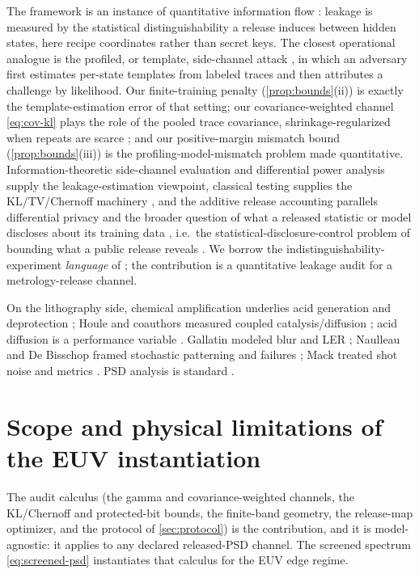 \documentclass[11pt]{article}
\begin{document}
The framework is an instance of quantitative information flow \cite{smith2009,alvim2020}: leakage is measured by the statistical distinguishability a release induces between hidden states, here recipe coordinates rather than secret keys. The closest operational analogue is the profiled, or template, side-channel attack \cite{chari2003,choudary2013}, in which an adversary first estimates per-state templates from labeled traces and then attributes a challenge by likelihood. Our finite-training penalty (\cref{prop:bounds}(ii)) is exactly the template-estimation error of that setting; our covariance-weighted channel \eqref{eq:cov-kl} plays the role of the pooled trace covariance, shrinkage-regularized when repeats are scarce \cite{ledoit2004}; and our positive-margin mismatch bound (\cref{prop:bounds}(iii)) is the profiling-model-mismatch problem made quantitative. Information-theoretic side-channel evaluation \cite{standaert2009} and differential power analysis \cite{kocher1999} supply the leakage-estimation viewpoint, classical testing supplies the KL/TV/Chernoff machinery \cite{cover2006}, and the additive release accounting parallels differential privacy \cite{dwork2006} and the broader question of what a released statistic or model discloses about its training data \cite{shokri2017}, i.e.\ the statistical-disclosure-control problem of bounding what a public release reveals \cite{dinur2003}. We borrow the indistinguishability-experiment \emph{language} of \cite{goldwasser1984}; the contribution is a quantitative leakage audit for a metrology-release channel.

On the lithography side, chemical amplification underlies acid generation and deprotection \cite{ito1983,reichmanis1991,wallraff1999}; Houle and coauthors measured coupled catalysis/diffusion \cite{houle2000,houle2004}; acid diffusion is a performance variable \cite{vansteenwinckel2005}. Gallatin modeled blur and LER \cite{gallatin2005,gallatin2008}; Naulleau and De Bisschop framed stochastic patterning and failures \cite{naulleau2011,deBisschop2017}; Mack treated shot noise and metrics \cite{mack2018shot,mack2019metrics}. PSD analysis is standard \cite{constantoudis2004,lorusso2018,cutler2021,palasantzas1993,wallow2008}.

\section{Scope and physical limitations of the EUV instantiation}
\label{sec:limitations}

The audit calculus (the gamma and covariance-weighted channels, the KL/Chernoff and protected-bit bounds, the finite-band geometry, the release-map optimizer, and the protocol of \cref{sec:protocol}) is the contribution, and it is model-agnostic: it applies to any declared released-PSD channel. The screened spectrum \eqref{eq:screened-psd} instantiates that calculus for the EUV edge regime.
\end{document}

